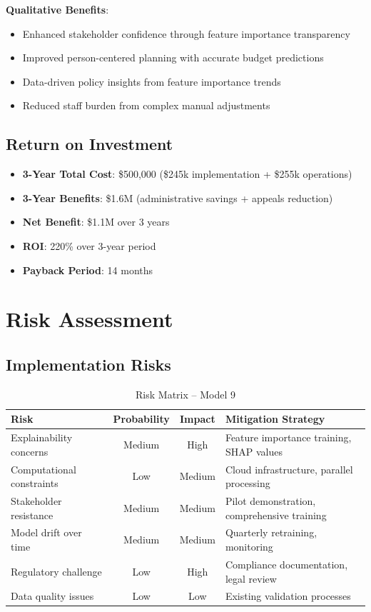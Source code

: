 \textbf{Qualitative Benefits}:
\begin{itemize}
    \item Enhanced stakeholder confidence through feature importance transparency
    \item Improved person-centered planning with accurate budget predictions
    \item Data-driven policy insights from feature importance trends
    \item Reduced staff burden from complex manual adjustments
\end{itemize}

\subsection{Return on Investment}

\begin{itemize}
    \item \textbf{3-Year Total Cost}: \$500,000 (\$245k implementation + \$255k operations)
    \item \textbf{3-Year Benefits}: \$1.6M (administrative savings + appeals reduction)
    \item \textbf{Net Benefit}: \$1.1M over 3 years
    \item \textbf{ROI}: 220\% over 3-year period
    \item \textbf{Payback Period}: 14 months
\end{itemize}

\section{Risk Assessment}

\subsection{Implementation Risks}

\begin{table}[h]
\centering
\caption{Risk Matrix -- Model 9}
\begin{tabular}{p{3.5cm}ccp{5cm}}
\toprule
\textbf{Risk} & \textbf{Probability} & \textbf{Impact} & \textbf{Mitigation Strategy} \\
\midrule
Explainability concerns & Medium & High & Feature importance training, SHAP values \\
Computational constraints & Low & Medium & Cloud infrastructure, parallel processing \\
Stakeholder resistance & Medium & Medium & Pilot demonstration, comprehensive training \\
Model drift over time & Medium & Medium & Quarterly retraining, monitoring \\
Regulatory challenge & Low & High & Compliance documentation, legal review \\
Data quality issues & Low & Low & Existing validation processes \\
\bottomrule
\end{tabular}
\label{tab:model9_risks}
\end{table}

